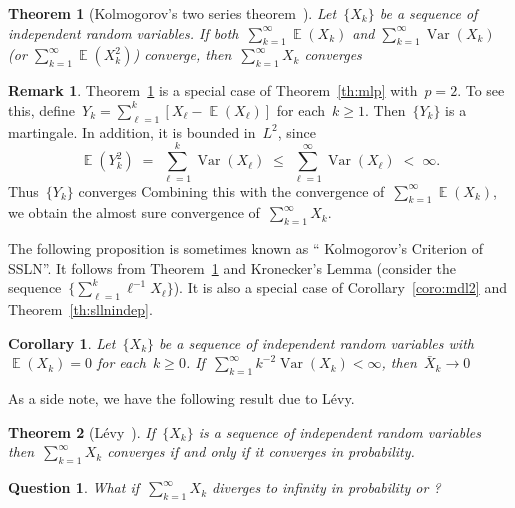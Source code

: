 \documentclass[12pt,a4paper]{article}  %
\newcounter{cite}
\newtheorem{theorem}{Theorem}[section]
\newtheorem{corollary}{Corollary}[section]
\newtheorem{question}{Question}[section]
\theoremstyle{definition}
\newtheorem{remark}{Remark}[section]
\numberwithin{equation}{section}
\newcommand{\as}{{\text{a.s.}}\xspace}
\DeclareMathOperator{\var}{Var}
\DeclareMathOperator{\expc}{\mathbb{E}}
\begin{document}
\begin{theorem}[Kolmogorov's two series theorem~\mbox{\cite[Theorems~2.5.6 and~2.5.8]{Durrett_2019}}]
    \label{th:kolmogorov2}
    Let~$\{X_k\}$ be a sequence of independent random variables.
    If both~$\sum_{k=1}^\infty \expc(X_k)$ and
    $\sum_{k=1}^\infty \var(X_k)$ \textnormal{(}or $\sum_{k=1}^\infty \expc(X_k^2)$\textnormal{)}
    converge, then~$\sum_{k=1}^\infty X_k$ converges \as
\end{theorem}

\begin{remark}
    \label{rem:kolmogorov2}
    Theorem~\ref{th:kolmogorov2} is a special case of Theorem~\ref{th:mlp} with~$p=2$.
    To see this, define~$Y_k = \sum_{\ell=1}^k [X_\ell-\expc(X_\ell)]$ for each~$k\ge 1$. Then~$\{Y_k\}$ is a
    martingale. In addition, it is bounded in~$L^2$, since
    \[
        \expc(Y_k^2) \;=\; \sum_{\ell=1}^k \var(X_\ell)
        \;\le\; \sum_{\ell=1}^\infty \var(X_\ell) \;<\; \infty.
    \]
    Thus~$\{Y_k\}$ converges \as Combining this with the convergence of~$\sum_{k=1}^\infty \expc(X_k)$,
    we obtain the almost sure convergence of~$\sum_{k=1}^\infty X_k$.
\end{remark}

The following proposition is sometimes known as `` Kolmogorov's Criterion of SSLN''.
It follows from Theorem~\ref{th:kolmogorov2} and Kronecker's Lemma
(consider the sequence~$\{\sum_{\ell=1}^k\ell^{-1}X_\ell\}$).
It is also a special case of Corollary~\ref{coro:mdl2} and Theorem~\ref{th:sllnindep}.

\begin{corollary}
    \label{coro:kolmogorov2}
    Let~$\{X_k\}$ be a sequence of independent random variables with~$\expc(X_k)=0$ for each~$k\ge 0$.
    If~$\sum_{k=1}^\infty k^{-2}\var(X_k) < \infty$, then~$\bar{X}_k\to 0$ \as
\end{corollary}

As a side note, we have the following result due to L\'evy.

\begin{theorem}[L\'evy~\mbox{\cite[Theorem 5.3.4]{Chung_2001}}]
    \label{th:levy}
    If~$\{X_k\}$ is a sequence of independent random variables
    then~$\sum_{k=1}^\infty X_k$ converges \as if and only if it converges in probability.
\end{theorem}

\begin{question}
    What if~$\sum_{k=1}^\infty X_k$ diverges to infinity in probability or \as?
\end{question}
\end{document}
